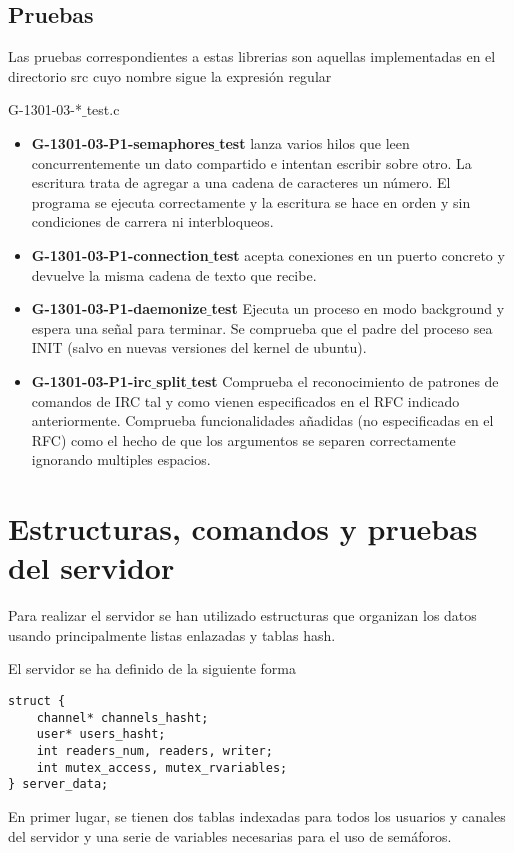 \documentclass{mathnotes}
\begin{document}
\subsection{Pruebas}
Las pruebas correspondientes a estas librerias son aquellas implementadas en el directorio src cuyo nombre sigue la expresión regular
\begin{center}
G-1301-03-*$\_$test.c
\end{center}
\begin{itemize}
\item \textbf{G-1301-03-P1-semaphores$\_$test} lanza varios hilos que leen concurrentemente un dato compartido e intentan escribir sobre otro. La escritura trata de agregar a una cadena de caracteres un número. El programa se ejecuta correctamente y la escritura se hace en orden y sin condiciones de carrera ni interbloqueos.
\item \textbf{G-1301-03-P1-connection$\_$test} acepta conexiones en un puerto concreto y devuelve la misma cadena de texto que recibe.
\item \textbf{G-1301-03-P1-daemonize$\_$test} Ejecuta un proceso en modo background y espera una señal para terminar. Se comprueba que el padre del proceso sea INIT (salvo en nuevas versiones del kernel de ubuntu).
\item \textbf{G-1301-03-P1-irc$\_$split$\_$test} Comprueba el reconocimiento de patrones de comandos de IRC tal y como vienen especificados en el RFC indicado anteriormente. Comprueba funcionalidades añadidas (no especificadas en el RFC) como el hecho de que los argumentos se separen correctamente ignorando multiples espacios.
\end{itemize}

\section{Estructuras, comandos y pruebas del servidor}
Para realizar el servidor se han utilizado estructuras que organizan los datos usando principalmente listas enlazadas y tablas hash.

El servidor se ha definido de la siguiente forma

\begin{lstlisting}
struct {
    channel* channels_hasht;
    user* users_hasht;
    int readers_num, readers, writer; 
    int mutex_access, mutex_rvariables;
} server_data;
\end{lstlisting}

En primer lugar, se tienen dos tablas indexadas para todos los usuarios y canales del servidor y una serie de variables necesarias para el uso de semáforos.
\end{document}
